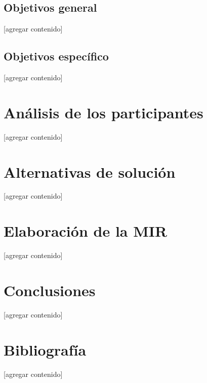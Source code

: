 \documentclass{article}
\begin{document}
\subsection{Objetivos general}\label{subsec:general-objs}
[agregar contenido]

\subsection{Objetivos específico}\label{subsec:specific-objs}
[agregar contenido]

\section{Análisis de los participantes}\label{sec:participants}
[agregar contenido]

\section{Alternativas de solución}\label{sec:alternatives}
[agregar contenido]

\section{Elaboración de la MIR}\label{sec:mir}
[agregar contenido]

\section{Conclusiones}\label{sec:conclutions}
[agregar contenido]

\section{Bibliografía}\label{sec:references}
[agregar contenido]
\end{document}
